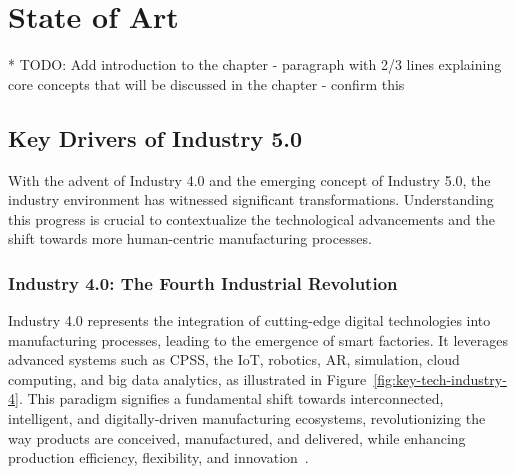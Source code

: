 \chapter{State of Art}%
\label{chapter:stateofart}

* TODO: Add introduction to the chapter - paragraph with 2/3 lines explaining core concepts that will be discussed in the chapter - confirm this

\section{Key Drivers of Industry 5.0}
\label{section:industry-evolution}
With the advent of Industry 4.0 and the emerging concept of Industry 5.0, the industry environment has witnessed significant transformations. Understanding this progress is crucial to contextualize the technological advancements and the shift towards more human-centric manufacturing processes.

\subsection{Industry 4.0: The Fourth Industrial Revolution}

Industry 4.0 represents the integration of cutting-edge digital technologies into manufacturing processes, leading to the emergence of smart factories. It leverages advanced systems such as \ac{CPSS}, the \ac{IoT}, robotics, \ac{AR}, simulation, cloud computing, and big data analytics, as illustrated in Figure~\ref{fig:key-tech-industry-4}. This paradigm signifies a fundamental shift towards interconnected, intelligent, and digitally-driven manufacturing ecosystems, revolutionizing the way products are conceived, manufactured, and delivered, while enhancing production efficiency, flexibility, and innovation~\cite{Moller2022, Ahmed2022}.

